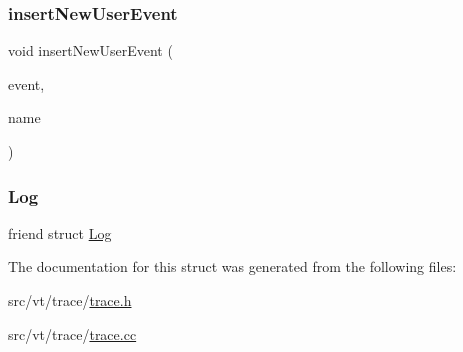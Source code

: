 \subsubsection{\texorpdfstring{insert\+New\+User\+Event}{insertNewUserEvent}}
{\footnotesize\ttfamily void insert\+New\+User\+Event (\begin{DoxyParamCaption}\item[{\hyperlink{namespacevt_1_1trace_a5908920d051c144c89f17c69ed262350}{User\+Event\+I\+D\+Type}}]{event,  }\item[{std\+::string const \&}]{name }\end{DoxyParamCaption})\hspace{0.3cm}{\ttfamily [friend]}}

\mbox{\label{structvt_1_1trace_1_1_trace_add132ae9df1b7ef820c8082c32b0f839}} 
\subsubsection{\texorpdfstring{Log}{Log}}
{\footnotesize\ttfamily friend struct \hyperlink{structvt_1_1trace_1_1_log}{Log}\hspace{0.3cm}{\ttfamily [friend]}}



The documentation for this struct was generated from the following files\+:\begin{DoxyCompactItemize}
\item 
src/vt/trace/\hyperlink{trace_8h}{trace.\+h}\item 
src/vt/trace/\hyperlink{trace_8cc}{trace.\+cc}\end{DoxyCompactItemize}
